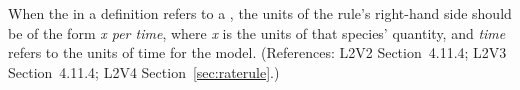 When the  in a \RateRule definition refers to a \Species,
the units of the rule's right-hand side should be of the form \emph{x per
time}, where \emph{x} is the units of that species' quantity, and
\emph{time} refers to the units of time for the model.  (References: L2V2
Section~4.11.4; L2V3 Section~4.11.4; L2V4 Section~\ref{sec:raterule}.)
